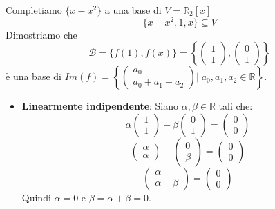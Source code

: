 \documentclass[a4paper]{article}
\theoremstyle{break}
\theoremstyle{break}
\theoremstyle{break}
\theoremstyle{break}
\begin{document}
\begin{example}
  \vspace{1em}
  \noindent Completiamo \( \{x-x^2\}  \) a una base di \( V = \mathbb{R}_2[x] \) 
  \[
  \{ x-x^2, 1, x \} \subseteq V
  \] 
  Dimostriamo che \[ \mathcal{B} = \{f(1), f(x)\} = \left\{ \begin{pmatrix} 1\\1 \end{pmatrix},
\begin{pmatrix} 0\\1 \end{pmatrix} \right\}     \]
è una base di \( Im(f) = \left\{ \begin{pmatrix} a_0\\a_0+a_1+a_2 \end{pmatrix} \Big |\; a_0,a_1,a_2 \in \mathbb{R} \right\}  \).
\begin{itemize}
  \item \textbf{Linearmente indipendente}: Siano \( \alpha, \beta \in \mathbb{R} \) tali
    che:
    \[
    \alpha \begin{pmatrix} 1\\1 \end{pmatrix} 
    +
    \beta \begin{pmatrix} 0\\1 \end{pmatrix} 
    =
    \begin{pmatrix} 0\\0 \end{pmatrix} 
    \] 
    \[
    \begin{pmatrix} \alpha\\\alpha \end{pmatrix} 
    +
    \begin{pmatrix} 0\\\beta \end{pmatrix}
    =
    \begin{pmatrix} 0\\0 \end{pmatrix}
    \] 
    \[
    \begin{pmatrix} \alpha\\\alpha+\beta \end{pmatrix} 
    =
    \begin{pmatrix} 0\\0 \end{pmatrix}
    \] 
    Quindi \( \alpha = 0 \) e \( \beta = \alpha + \beta = 0 \).


\end{itemize}
\end{example}
\end{document}
